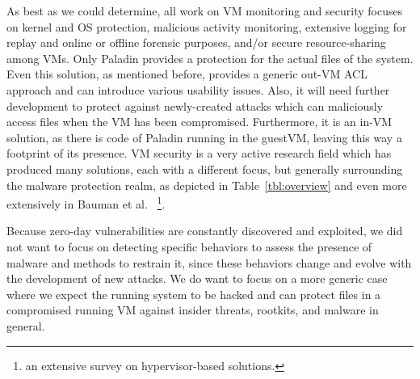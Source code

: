 \par As best as we could determine, all work on \ac{VM} monitoring and security focuses on kernel and \ac{OS} protection, malicious activity monitoring, extensive logging for replay and online or offline forensic purposes, and/or secure resource-sharing among \ac{VM}s. Only Paladin \cite{baliga2008automated} provides a protection for the actual files of the system. Even this solution, as mentioned before, provides a generic out-\ac{VM} \ac{ACL} approach and can introduce various usability issues. Also, it will need further development to protect against newly-created attacks which can maliciously access files when the \ac{VM} has been compromised. Furthermore, it is an in-\ac{VM} solution, as there is code of Paladin running in the guest\ac{VM}, leaving this way a footprint of its presence. \ac{VM} security is a very active research field which has produced many solutions, each with a different focus, but generally surrounding the malware protection realm, as depicted in Table~\ref{tbl:overview} and even more extensively in Bauman et al.~ \cite{bauman2015survey}\footnote{an extensive survey on hypervisor-based solutions.}.


\par Because zero-day vulnerabilities are constantly discovered and exploited, we did not want to focus on detecting specific behaviors to assess the presence of malware and methods to restrain it, since these behaviors change and evolve with the development of new attacks. We do want to focus on a more generic case where we expect the running system to be hacked and can protect files in a compromised running \ac{VM} against insider threats, rootkits, and malware in general. 




